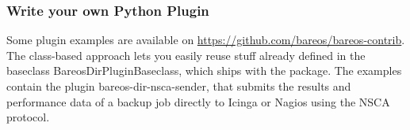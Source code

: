\subsubsection{Write your own Python Plugin}

Some plugin examples are available on \url{https://github.com/bareos/bareos-contrib}. 
The class-based approach lets you easily reuse stuff already
defined in the baseclass BareosDirPluginBaseclass, which ships with the  package.
The examples contain the plugin bareos-dir-nsca-sender, that submits the results and performance data of a backup job directly to Icinga or Nagios using the NSCA protocol.
